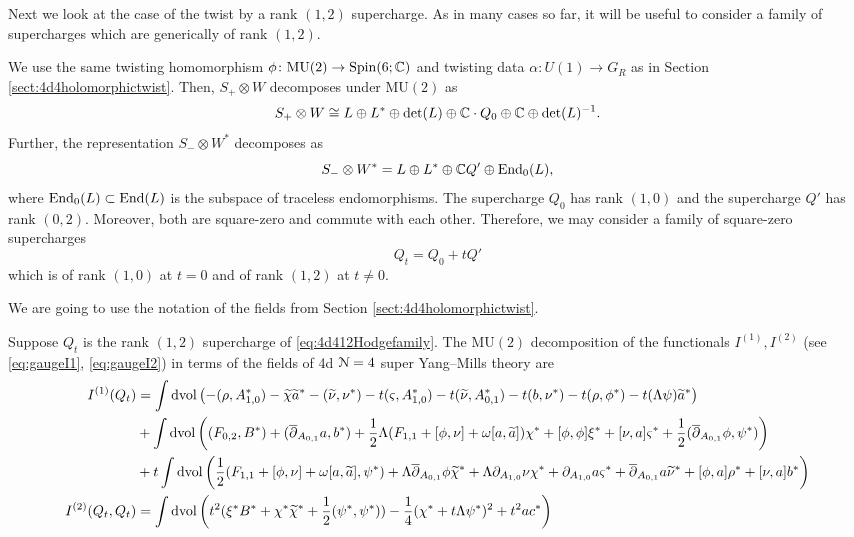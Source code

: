 \documentclass[10pt, oneside]{article}
\newcommand{\MU}{\mathrm{MU}}
\begin{document}
Next we look at the case of the twist by a rank $(1,2)$ supercharge. 
As in many cases so far, it will be useful to consider a family of supercharges which are generically of rank $(1,2)$. 

We use the same twisting homomorphism $\phi\colon \MU(2) \to \Spin(6;\CC)$ and twisting data $\alpha\colon U(1) \to G_R$ as in Section \ref{sect:4d4holomorphictwist}.
Then, $S_+ \otimes W$ decomposes under $\MU(2)$ as
\[
S_+\otimes W\cong L\oplus L^*\oplus \det(L)\oplus \mathbb C \cdot Q_0 \oplus \mathbb C \oplus \det(L)^{-1}.
\]
Further, the representation $S_- \otimes W^*$ decomposes as
\[
S_- \otimes W^* = L \oplus L^* \oplus \mathbb C Q'\oplus\operatorname{End}_0(L),
\]
where $\operatorname{End}_0(L)\subset \operatorname{End}(L)$ is the subspace of traceless endomorphisms. The supercharge $Q_0$ has rank $(1, 0)$ and the supercharge $Q'$ has rank $(0, 2)$. Moreover, both are square-zero and commute with each other. Therefore, we may consider a family of square-zero supercharges
\begin{equation}
Q_t = Q_0 + tQ'
\label{eq:4d412Hodgefamily}
\end{equation}
which is of rank $(1, 0)$ at $t=0$ and of rank $(1, 2)$ at $t\neq 0$.

We are going to use the notation of the fields from Section \ref{sect:4d4holomorphictwist}.

\begin{prop}
Suppose $Q_t$ is the rank $(1,2)$ supercharge of \eqref{eq:4d412Hodgefamily}. The $\MU(2)$ decomposition of the functionals $I^{(1)}, I^{(2)}$ (see \eqref{eq:gaugeI1}, \eqref{eq:gaugeI2}) in terms of the fields of 4d $\mathcal N=4$ super Yang--Mills theory are
\begin{align*}
I^{(1)}(Q_t) &= \int \operatorname{dvol}\left(-(\rho, A_{1, 0}^*) - \widetilde{\chi}\widetilde{a}^* - (\widetilde{\nu}, \nu^*) - t(\varsigma, A_{1, 0}^*) - t(\widetilde{\nu}, A_{0, 1}^*) - t(b, \nu^*) - t(\rho, \phi^*) - t(\Lambda\psi)\widetilde{a}^*\right) \\
&+ \int\operatorname{dvol}\left((F_{0, 2}, B^*) + (\overline{\partial}_{A_{0, 1}}a, b^*) + \frac{1}{2}\Lambda(F_{1, 1} + [\phi, \nu] + \omega [a, \widetilde{a}])\chi^* + [\phi, \phi]\xi^* + [\nu, a]\varsigma^* + \frac{1}{2} (\overline{\partial}_{A_{0,1}} \phi, \psi^*)\right) \\
&+t\int\operatorname{dvol}\left(\frac{1}{2} (F_{1, 1} + [\phi, \nu] + \omega [a, \widetilde{a}], \psi^*) + \Lambda \overline{\partial}_{A_{0, 1}} \phi \widetilde{\chi}^* + \Lambda \partial_{A_{1, 0}}\nu \chi^* + \partial_{A_{1, 0}} a \varsigma^* + \overline{\partial}_{A_{0, 1}} a \widetilde{\nu}^* + [\phi, a]\rho^* + [\nu, a]b^*\right) \\
I^{(2)} (Q_t, Q_t) &= \int \operatorname{dvol} \left(t^2(\xi^*B^* + \chi^*\widetilde{\chi}^* + \frac{1}{2}(\psi^*, \psi^*)) -\frac{1}{4}(\chi^* + t \Lambda\psi^*)^2 + t^2 ac^*\right) \\
\end{align*}
\end{prop}
\end{document}

